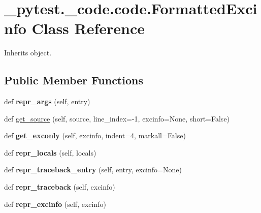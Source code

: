\hypertarget{class__pytest_1_1__code_1_1code_1_1_formatted_excinfo}{}\section{\+\_\+pytest.\+\_\+code.\+code.\+Formatted\+Excinfo Class Reference}
\label{class__pytest_1_1__code_1_1code_1_1_formatted_excinfo}


Inherits object.

\subsection*{Public Member Functions}
\begin{DoxyCompactItemize}
\item 
\mbox{\label{class__pytest_1_1__code_1_1code_1_1_formatted_excinfo_a9b4f736f9ed5e58fe18a93950f65a056}} 
def {\bfseries repr\+\_\+args} (self, entry)
\item 
def \hyperlink{class__pytest_1_1__code_1_1code_1_1_formatted_excinfo_ac48788018b7dabd02316916b29d09ea6}{get\+\_\+source} (self, source, line\+\_\+index=-\/1, excinfo=None, short=False)
\item 
\mbox{\label{class__pytest_1_1__code_1_1code_1_1_formatted_excinfo_a7f35e0fa096911a93fb230e5ce6df5bd}} 
def {\bfseries get\+\_\+exconly} (self, excinfo, indent=4, markall=False)
\item 
\mbox{\label{class__pytest_1_1__code_1_1code_1_1_formatted_excinfo_a228a7d37e96d781429198513c7104ba9}} 
def {\bfseries repr\+\_\+locals} (self, locals)
\item 
\mbox{\label{class__pytest_1_1__code_1_1code_1_1_formatted_excinfo_a47e5d27515347c1b08e3bb6d6e3b51f8}} 
def {\bfseries repr\+\_\+traceback\+\_\+entry} (self, entry, excinfo=None)
\item 
\mbox{\label{class__pytest_1_1__code_1_1code_1_1_formatted_excinfo_a89c0cae4d8f3864f81b99018b2b01565}} 
def {\bfseries repr\+\_\+traceback} (self, excinfo)
\item 
\mbox{\label{class__pytest_1_1__code_1_1code_1_1_formatted_excinfo_af239c5e0c39d7721c1346d6a3a5cb7ca}} 
def {\bfseries repr\+\_\+excinfo} (self, excinfo)
\end{DoxyCompactItemize}
